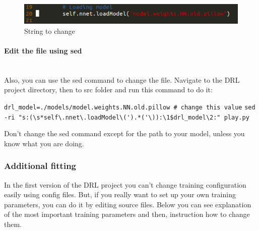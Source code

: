 \documentclass[a4paper,oneside,dvipsnames]{article}
\begin{document}
\begin{figure}[h]
    \centering
    \includegraphics[scale=0.53]{load_model.png}
    \caption*{String to change}
    \label{fig:theModel}
\end{figure}


\paragraph*{Edit the file using sed}\mbox{}\\
Also, you can use the sed command to change the file. Navigate to the DRL project directory, then to src folder and run this command to do it:
\begin{tcolorbox}[width=\linewidth]
\verb!drl_model=./models/model.weights.NN.old.pillow # change this value!
\verb!sed -ri "s:(\s*self\.nnet\.loadModel\(').*('\)):\1$drl_model\2:" play.py!
\end{tcolorbox}

\begin{tcolorbox}[colbacktitle=red!40!white, coltitle=black, width=\linewidth, fonttitle=\bfseries, title=WARNING]
Don't change the sed command except for the path to your model, unless you know what you are doing.
\end{tcolorbox}

\subsubsection*{Additional fitting}
In the first version of the DRL project you can't change training configuration easily using config files. But, if you really want to set up your own training parameters, you can do it by editing source files. Below you can see explanation of the most important training parameters and then, instruction how to change them.
\end{document}
